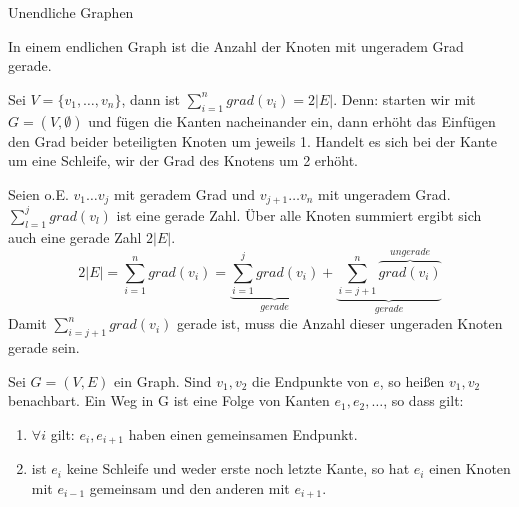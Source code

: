 \begin{beispiel}
	Unendliche Graphen
	
\end{beispiel}


\begin{bemerkung}
	In einem endlichen Graph ist die Anzahl der Knoten mit ungeradem Grad gerade.
\end{bemerkung}


\begin{beweis}
	Sei $V = \{ v_1, \dots, v_n \}$, dann ist $\sum_{i=1}^n grad(v_i) = 2 |E|$. Denn: starten wir mit $G = (V, \emptyset)$ und fügen die Kanten nacheinander ein, dann erhöht das Einfügen den Grad beider beteiligten Knoten um jeweils 1. Handelt es sich bei der Kante um eine Schleife, wir der Grad des Knotens um 2 erhöht.
	
	Seien o.E. $v_1 \dots v_j$ mit geradem Grad und $v_{j+1} \dots v_n$ mit ungeradem Grad. $\sum_{l=1}^j grad(v_l)$ ist eine gerade Zahl. Über alle Knoten summiert ergibt sich auch eine gerade Zahl $2|E|$.
	$$ 2|E| = \sum_{i=1}^n grad(v_i) = \underbrace{\sum_{i=1}^j grad(v_i)}_{gerade} + \underbrace{\sum_{i=j+1}^n \overbrace{grad(v_i)}^{ungerade}}_{gerade} $$
	Damit $\sum_{i=j+1}^n grad(v_i)$ gerade ist, muss die Anzahl dieser ungeraden Knoten gerade sein.
\end{beweis}


\begin{definition}
	Sei $G = (V,E)$ ein Graph. Sind $v_1, v_2$ die Endpunkte von $e$, so heißen $v_1, v_2$ benachbart. Ein Weg in G ist eine Folge von Kanten $e_1, e_2, \dots$, so dass gilt:
	\begin{enumerate}
		\item $\forall i$ gilt: $e_i, e_{i+1}$ haben einen gemeinsamen Endpunkt.
		\item ist $e_i$ keine Schleife und weder erste noch letzte Kante, so hat $e_i$ einen Knoten mit $e_{i-1}$ gemeinsam und den anderen mit $e_{i+1}$.
	\end{enumerate}
\end{definition}	


